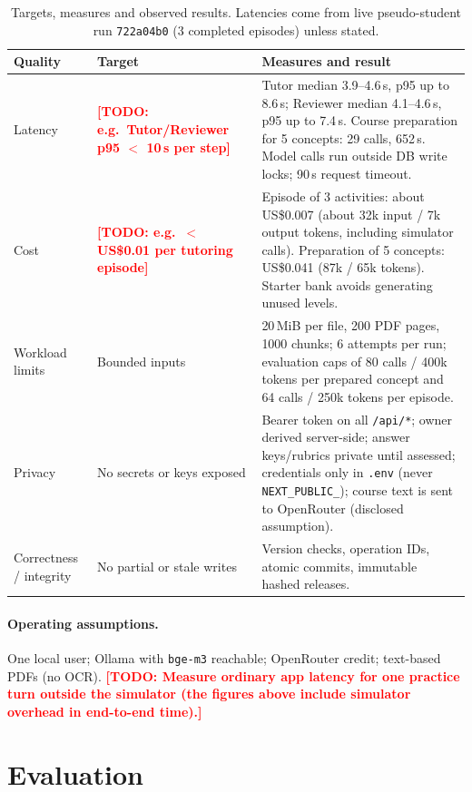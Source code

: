 \documentclass{article}
\newcommand{\todo}[1]{\textcolor{red}{\textbf{[TODO: #1]}}}
\newcommand{\code}[1]{\texttt{\small #1}}
\begin{document}
\begin{table}[H]
\centering
\small
\caption{Targets, measures and observed results. Latencies come from live pseudo-student run \code{722a04b0} (3 completed episodes) unless stated.}
\begin{tabularx}{\linewidth}{@{}p{1.7cm}p{2.6cm}X@{}}
\toprule
\textbf{Quality} & \textbf{Target} & \textbf{Measures and result} \\
\midrule
Latency & \todo{e.g.\ Tutor/Reviewer p95 $<$ 10\,s per step} & Tutor median 3.9--4.6\,s, p95 up to 8.6\,s; Reviewer median 4.1--4.6\,s, p95 up to 7.4\,s. Course preparation for 5 concepts: 29 calls, 652\,s. Model calls run outside DB write locks; 90\,s request timeout. \\
Cost & \todo{e.g.\ $<$ US\$0.01 per tutoring episode} & Episode of 3 activities: about US\$0.007 (about 32k input / 7k output tokens, including simulator calls). Preparation of 5 concepts: US\$0.041 (87k / 65k tokens). Starter bank avoids generating unused levels. \\
Workload limits & Bounded inputs & 20\,MiB per file, 200 PDF pages, 1000 chunks; 6 attempts per run; evaluation caps of 80 calls / 400k tokens per prepared concept and 64 calls / 250k tokens per episode. \\
Privacy & No secrets or keys exposed & Bearer token on all \code{/api/*}; owner derived server-side; answer keys/rubrics private until assessed; credentials only in \code{.env} (never \code{NEXT\_PUBLIC\_}); course text is sent to OpenRouter (disclosed assumption). \\
Correctness / integrity & No partial or stale writes & Version checks, operation IDs, atomic commits, immutable hashed releases. \\
\bottomrule
\end{tabularx}
\end{table}

\paragraph{Operating assumptions.} One local user; Ollama with \code{bge-m3} reachable; OpenRouter credit; text-based PDFs (no OCR). \todo{Measure ordinary app latency for one practice turn outside the simulator (the figures above include simulator overhead in end-to-end time).}

\section{Evaluation}
\label{sec:eval}
\end{document}
